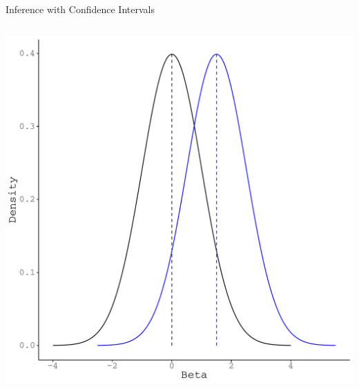 \documentclass[10pt]{beamer}\usepackage[]{graphicx}\usepackage[]{color}
\makeatletter
\def\maxwidth{ %
  \ifdim\Gin@nat@width>\linewidth
    \linewidth
  \else
    \Gin@nat@width
  \fi
}
\newenvironment{knitrout}{}{} %
\makeatother
\begin{document}
\begin{frame}{Inference with Confidence Intervals}
\begin{columns}
\begin{column}{0.5\textwidth}
\begin{knitrout}
{\centering \includegraphics[width=\maxwidth]{figure/unnamed-chunk-21-1} 

}


\end{knitrout}

\end{column}
\end{columns}

\end{frame}

\end{document}
